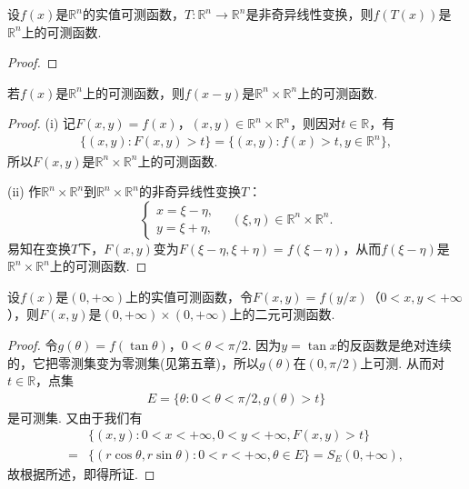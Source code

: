 \documentclass[../../main.tex]{subfiles}
\begin{document}
\begin{corollary}
设\(f(x)\)是\(\mathbb{R}^{n}\)的实值可测函数，\(T: \mathbb{R}^{n} \to \mathbb{R}^{n}\)是非奇异线性变换，则\(f(T(x))\)是\(\mathbb{R}^{n}\)上的可测函数.
\end{corollary}
\begin{proof}


\end{proof}

\begin{example}
若\(f(x)\)是\(\mathbb{R}^{n}\)上的可测函数，则\(f(x - y)\)是\(\mathbb{R}^{n} \times \mathbb{R}^{n}\)上的可测函数.
\end{example}
\begin{proof}
(i) 记\(F(x, y) = f(x)\)，\((x, y) \in \mathbb{R}^{n} \times \mathbb{R}^{n}\)，则因对\(t \in \mathbb{R}\)，有
\begin{align*}
\{(x, y): F(x, y) > t\} = \{(x, y): f(x) > t, y \in \mathbb{R}^{n}\},
\end{align*}
所以\(F(x, y)\)是\(\mathbb{R}^{n} \times \mathbb{R}^{n}\)上的可测函数.

(ii) 作\(\mathbb{R}^{n} \times \mathbb{R}^{n}\)到\(\mathbb{R}^{n} \times \mathbb{R}^{n}\)的非奇异线性变换\(T\)：
\[
\begin{cases}
x = \xi - \eta, \\
y = \xi + \eta,
\end{cases}
\quad (\xi, \eta) \in \mathbb{R}^{n} \times \mathbb{R}^{n}.
\]
易知在变换\(T\)下，\(F(x, y)\)变为\(F(\xi - \eta, \xi + \eta) = f(\xi - \eta)\)，从而\(f(\xi - \eta)\)是\(\mathbb{R}^{n} \times \mathbb{R}^{n}\)上的可测函数.

\end{proof}

\begin{example}
设\(f(x)\)是\((0, +\infty)\)上的实值可测函数，令\(F(x, y) = f(y / x)\)（\(0 < x, y < +\infty\)），则\(F(x, y)\)是\((0, +\infty) \times (0, +\infty)\)上的二元可测函数.
\end{example}
\begin{proof}
令\(g(\theta) = f(\tan\theta)\)，\(0 < \theta < \pi / 2\). 因为\(y = \tan x\)的反函数是绝对连续的，它把零测集变为零测集(见第五章)，所以\(g(\theta)\)在\((0, \pi / 2)\)上可测. 从而对\(t \in \mathbb{R}\)，点集
\begin{align*}
E = \{\theta: 0 < \theta < \pi / 2, g(\theta) > t\}
\end{align*}
是可测集. 又由于我们有
\begin{align*}
&\{(x, y): 0 < x < +\infty, 0 < y < +\infty, F(x, y) > t\} \\
=&\{(r\cos\theta, r\sin\theta): 0 < r < +\infty, \theta \in E\} = S_{E}(0, +\infty),
\end{align*}
故根据所述，即得所证.

\end{proof}
\end{document}
